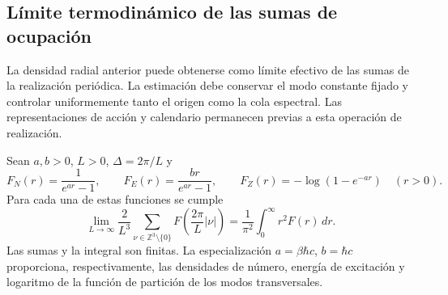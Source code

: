 \subsection{Límite termodinámico de las sumas de ocupación}
\label{v:subsec:limite-termodinamico}

La densidad radial anterior puede obtenerse como límite efectivo de las
sumas de la realización periódica. La estimación debe conservar el modo
constante fijado y controlar uniformemente tanto el origen como la cola
espectral. Las representaciones de acción y calendario permanecen previas
a esta operación de realización.

\begin{lemma}
\label{v:lem:limite-termodinamico}
Sean \(a,b>0\), \(L>0\), \(\Delta=2\pi/L\) y
\[
 F_N(r)=\frac{1}{e^{ar}-1},\qquad
 F_E(r)=\frac{br}{e^{ar}-1},\qquad
 F_Z(r)=-\log(1-e^{-ar})\quad(r>0).
\]
Para cada una de estas funciones se cumple
\begin{equation}
 \lim_{L\to\infty}\frac{2}{L^3}
 \sum_{\nu\in\mathbb Z^3\setminus\{0\}}
 F\!\left(\frac{2\pi}{L}|\nu|\right)
 =\frac{1}{\pi^2}\int_0^\infty r^2F(r)\,dr.
 \label{v:eq:limite-modos-discretos}
\end{equation}
Las sumas y la integral son finitas. La especialización
\(a=\beta\hbar c\), \(b=\hbar c\) proporciona, respectivamente,
las densidades de número, energía de excitación y logaritmo de la función
de partición de los modos transversales.
\end{lemma}

